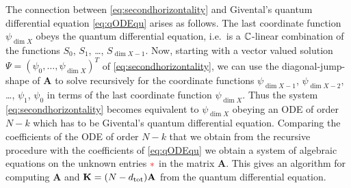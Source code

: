 \documentclass[twoside,leqno]{article}
\numberwithin{equation}{section}
\theoremstyle{plain}
\theoremstyle{definition}
\begin{document}
The connection between \eqref{eq:secondhorizontality} and Givental's quantum differential equation \eqref{eq:qODEqu} arises as follows. The last coordinate function 
$\psi_{\dim X}$ obeys the quantum differential equation, i.e.\ is a $\mathbb C$-linear combination of the functions $S_{0}$, $S_{1}$, \ldots, $S_{\dim X -1}$.  Now, starting with a  vector valued solution $\Psi = (\psi_{0}, \ldots, \psi_{\dim X})^{T}$ of \eqref{eq:secondhorizontality}, we can use the diagonal-jump-shape of $\mathbf{A}$ to solve recursively for the coordinate functions 
$\psi_{\dim X -1}$, $\psi_{\dim X - 2}$, \ldots , $\psi_{1}$, $\psi_{0}$ in terms of the 
last coordinate function $\psi_{\dim X}$. Thus the system \eqref{eq:secondhorizontality} becomes  equivalent to $\psi_{\dim X}$ obeying an ODE of order $N - k$ which has to be Givental's  quantum differential equation. Comparing the coefficients of the ODE of order  $N-k$ that we obtain from the recursive procedure with the coefficients of  \eqref{eq:qODEqu} we obtain a system of algebraic equations on the unknown entries ${\color{red}{*}}$ in the matrix $\mathbf{A}$. This gives an algorithm for computing $\mathbf{A}$ and $\mathbf{K} = (N-d_{\operatorname{tot}}) \mathbf{A}$ from the quantum differential equation.
\end{document}
